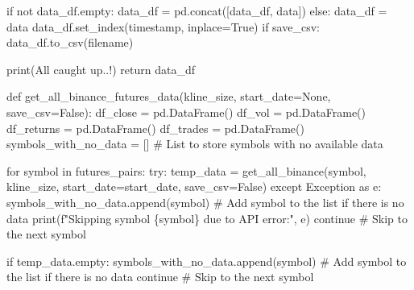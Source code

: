 \documentclass[
  letterpaper,
  DIV=11,
  numbers=noendperiod]{scrartcl}
\newenvironment{Shaded}{\begin{snugshade}}{\end{snugshade}}
\newcommand{\BuiltInTok}[1]{\textcolor[rgb]{0.00,0.23,0.31}{#1}}
\newcommand{\CommentTok}[1]{\textcolor[rgb]{0.37,0.37,0.37}{#1}}
\newcommand{\ControlFlowTok}[1]{\textcolor[rgb]{0.00,0.23,0.31}{#1}}
\newcommand{\ImportTok}[1]{\textcolor[rgb]{0.00,0.46,0.62}{#1}}
\newcommand{\KeywordTok}[1]{\textcolor[rgb]{0.00,0.23,0.31}{#1}}
\newcommand{\NormalTok}[1]{\textcolor[rgb]{0.00,0.23,0.31}{#1}}
\newcommand{\OperatorTok}[1]{\textcolor[rgb]{0.37,0.37,0.37}{#1}}
\newcommand{\PreprocessorTok}[1]{\textcolor[rgb]{0.68,0.00,0.00}{#1}}
\newcommand{\SpecialCharTok}[1]{\textcolor[rgb]{0.37,0.37,0.37}{#1}}
\newcommand{\SpecialStringTok}[1]{\textcolor[rgb]{0.13,0.47,0.30}{#1}}
\newcommand{\StringTok}[1]{\textcolor[rgb]{0.13,0.47,0.30}{#1}}
\newcommand{\VariableTok}[1]{\textcolor[rgb]{0.07,0.07,0.07}{#1}}
\begin{document}
\begin{Shaded}
\begin{Highlighting}[]
    \ControlFlowTok{if} \KeywordTok{not}\NormalTok{ data\_df.empty:}
\NormalTok{        data\_df }\OperatorTok{=}\NormalTok{ pd.concat([data\_df, data])}
    \ControlFlowTok{else}\NormalTok{:}
\NormalTok{        data\_df }\OperatorTok{=}\NormalTok{ data}
\NormalTok{    data\_df.set\_index(}\StringTok{\textquotesingle{}timestamp\textquotesingle{}}\NormalTok{, inplace}\OperatorTok{=}\VariableTok{True}\NormalTok{)}
    \ControlFlowTok{if}\NormalTok{ save\_csv:}
\NormalTok{        data\_df.to\_csv(filename)}

    \BuiltInTok{print}\NormalTok{(}\StringTok{\textquotesingle{}All caught up..!\textquotesingle{}}\NormalTok{)}
    \ControlFlowTok{return}\NormalTok{ data\_df}


\KeywordTok{def}\NormalTok{ get\_all\_binance\_futures\_data(kline\_size, start\_date}\OperatorTok{=}\VariableTok{None}\NormalTok{, save\_csv}\OperatorTok{=}\VariableTok{False}\NormalTok{):}
\NormalTok{    df\_close }\OperatorTok{=}\NormalTok{ pd.DataFrame()}
\NormalTok{    df\_vol }\OperatorTok{=}\NormalTok{ pd.DataFrame()}
\NormalTok{    df\_returns }\OperatorTok{=}\NormalTok{ pd.DataFrame()}
\NormalTok{    df\_trades }\OperatorTok{=}\NormalTok{ pd.DataFrame()}
\NormalTok{    symbols\_with\_no\_data }\OperatorTok{=}\NormalTok{ []  }\CommentTok{\# List to store symbols with no available data}

    \ControlFlowTok{for}\NormalTok{ symbol }\KeywordTok{in}\NormalTok{ futures\_pairs:}
        \ControlFlowTok{try}\NormalTok{:}
\NormalTok{            temp\_data }\OperatorTok{=}\NormalTok{ get\_all\_binance(symbol, kline\_size, start\_date}\OperatorTok{=}\NormalTok{start\_date, save\_csv}\OperatorTok{=}\VariableTok{False}\NormalTok{)}
        \ControlFlowTok{except} \PreprocessorTok{Exception} \ImportTok{as}\NormalTok{ e:}
\NormalTok{            symbols\_with\_no\_data.append(symbol)  }\CommentTok{\# Add symbol to the list if there is no data}
            \BuiltInTok{print}\NormalTok{(}\SpecialStringTok{f"Skipping symbol \textquotesingle{}}\SpecialCharTok{\{}\NormalTok{symbol}\SpecialCharTok{\}}\SpecialStringTok{\textquotesingle{} due to API error:"}\NormalTok{, e)}
            \ControlFlowTok{continue}  \CommentTok{\# Skip to the next symbol}

        \ControlFlowTok{if}\NormalTok{ temp\_data.empty:}
\NormalTok{            symbols\_with\_no\_data.append(symbol)  }\CommentTok{\# Add symbol to the list if there is no data}
            \ControlFlowTok{continue}  \CommentTok{\# Skip to the next symbol}


\end{Highlighting}
\end{Shaded}
\end{document}
